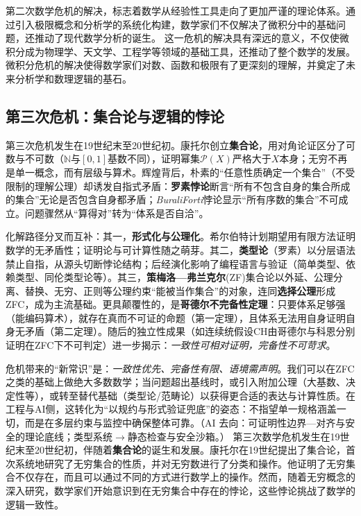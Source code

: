 第二次数学危机的解决，标志着数学从经验性工具走向了更加严谨的理论体系。通过引入极限概念和分析学的系统化构建，数学家们不仅解决了微积分中的基础问题，还推动了现代数学分析的诞生。
这一危机的解决具有深远的意义，不仅使微积分成为物理学、天文学、工程学等领域的基础工具，还推动了整个数学的发展。微积分危机的解决使得数学家们对数、函数和极限有了更深刻的理解，并奠定了未来分析学和数理逻辑的基石。

\subsection{第三次危机：集合论与逻辑的悖论}

第三次危机发生在19世纪末至20世纪初。康托尔创立{\bf 集合论}，用对角论证区分了可数与不可数（$\mathbb{N}$与$[0,1]$基数不同），证明幂集$\mathcal{P}(X)$严格大于$X$本身；无穷不再是单一概念，而有层级与算术。辉煌背后，朴素的“任意性质确定一个集合”（不受限制的理解公理）却诱发自指式矛盾：{\bf 罗素悖论}断言“所有不包含自身的集合所成的集合”无论是否包含自身都矛盾；{\itshape Burali\textendash Forti}悖论显示“所有序数的集合”不可成立。问题骤然从“算得对”转为“体系是否自洽”。

化解路径分叉而互补：其一，{\bf 形式化与公理化}。希尔伯特计划期望用有限方法证明数学的无矛盾性；证明论与可计算性随之萌芽。其二，{\bf 类型论}（罗素）以分层语法禁止自指，从源头切断悖论结构；后经演化影响了编程语言与验证（简单类型、依赖类型、同伦类型论等）。其三，{\bf 策梅洛—弗兰克尔}(ZF)集合论以外延、公理分离、替换、无穷、正则等公理约束“能被当作集合”的对象，连同{\bf 选择公理}形成ZFC，成为主流基础。更具颠覆性的，是{\bf 哥德尔不完备性定理}：只要体系足够强（能编码算术），就存在真而不可证的命题（第一定理），且体系无法用自身证明自身无矛盾（第二定理）。随后的独立性成果（如连续统假设CH由哥德尔与科恩分别证明在ZFC下不可判定）进一步揭示：{\itshape 一致性可相对证明，完备性不可苛求}。

危机带来的“新常识”是：{\itshape 一致性优先、完备性有限、语境需声明}。我们可以在ZFC之类的基础上做绝大多数数学；当问题超出基线时，或引入附加公理（大基数、决定性等），或转至替代基础（类型论/范畴论）以获得更合适的表达与计算性质。在工程与AI侧，这转化为“以规约与形式验证兜底”的姿态：不指望单一规格涵盖一切，而是在多层约束与监控中确保整体可靠。{（AI 去向：可证明性边界—对齐与安全的理论底线；类型系统$\rightarrow$静态检查与安全沙箱。）}
第三次数学危机发生在19世纪末至20世纪初，伴随着{\bf 集合论}的诞生和发展。康托尔在19世纪提出了集合论，首次系统地研究了无穷集合的性质，并对无穷数进行了分类和操作。他证明了无穷集合不仅存在，而且可以通过不同的方式进行数学上的操作。然而，随着无穷概念的深入研究，数学家们开始意识到在无穷集合中存在的悖论，这些悖论挑战了数学的逻辑一致性。


